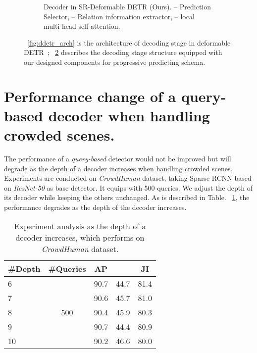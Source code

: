 \documentclass[final]{cvpr}
\begin{document}
\begin{figure}[!t]
\begin{subfigure}{\linewidth}
     \caption{Decoder in SR-Deformable DETR (Ours).  -- Prediction Selector,  -- Relation information extractor,  -- local multi-head self-attention.}
    \label{fig:sr_ddetr}
  \end{subfigure}
  \vspace{-0.5pc}
  \caption{~\ref{fig:ddetr_arch} is the architecture of decoding stage in deformable DETR~\cite{zhu2021deformable};
  ~\ref{fig:sr_ddetr} describes the decoding stage structure equipped with our designed components for progressive predicting schema. }
  
\end{figure}







\vspace{-0.2cm}
\section{Performance change of a query-based decoder when handling crowded scenes.}
The performance of a \emph{query-based} detector would not be improved but will degrade as the depth of a decoder increases when handling crowded scenes. Experiments are conducted on \emph{CrowdHuman} dataset, taking Sparse RCNN based on \emph{ResNet-50} as base detector. It equips with 500 queries. We adjust the depth of its decoder while keeping the others unchanged. As is described in Table. ~\ref{tbl:depth_exp}, the performance degrades as the depth of the decoder increases.

\vspace{-0.2cm}
\begin{table}[ht]
	\centering
	\begin{tabular}{l|c|ccc}
		\toprule
		 \#Depth& \#Queries & AP &   & JI \\
		\hline
		 6 & & 90.7 & 44.7 & 81.4 \\
		 7 & & 90.6 & 45.7 & 81.0 \\
		8 & 500& 90.4 & 45.9 & 80.3 \\
		9 & & 90.7 & 44.4 & 80.9 \\
        10 & & 90.2 & 46.6 & 80.0 \\
		\bottomrule
	\end{tabular}
	\caption{Experiment analysis as the depth of a decoder increases, which performs on \emph{CrowdHuman} dataset.}
	\label{tbl:depth_exp}
	\vspace{-1.5pc}
\end{table}
\end{document}
